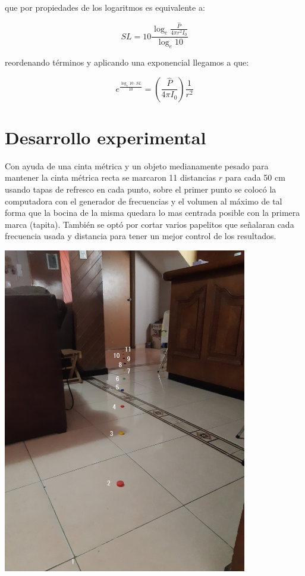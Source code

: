 \documentclass[DIV=calc, paper=a4, fontsize=11pt]{scrartcl}
\newenvironment{Figura}
  {\par\medskip\noindent\minipage{\linewidth}}
  {\endminipage\par\medskip}
\begin{document}
\begin{multicols}{2}
\noindent que por propiedades de los logaritmos es equivalente a:

\begin{equation}
    SL = 10 \frac{\log_{e}{\frac{\hat{P}}{4 \pi r^2 I_0}}}{\log_{e}{10}}
\end{equation}

\noindent reordenando términos y aplicando una exponencial llegamos a que:

\begin{equation}
    e^{\frac{\log_{e}{10}\cdot SL}{10}} = \left( \frac{\hat{P}}{4 \pi I_0}\right) \frac{1}{r^2}
\end{equation}







\section*{Desarrollo experimental}

Con ayuda de una cinta métrica y un objeto medianamente pesado para mantener la cinta métrica recta se marcaron 11 distancias $r$ para cada 50 cm usando tapas de refresco en cada punto, sobre el primer punto se colocó la computadora con el generador de frecuencias y el volumen al máximo de tal forma que la bocina de la misma quedara lo mas centrada posible con la primera marca (tapita). También se optó por cortar varios papelitos que señalaran cada frecuencia usada y distancia para tener un mejor control de los resultados.

\begin{Figura}
\centering
    \includegraphics[width=0.8\textwidth]{20220226_145231.jpg}
    \label{fig}
\end{Figura}


\end{multicols}
\end{document}

